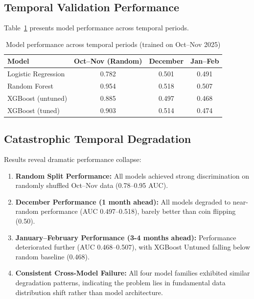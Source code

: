 \documentclass{report}
\begin{document}
\subsection{Temporal Validation Performance}

Table~\ref{tab:temporal_perf} presents model performance across temporal
periods.

\begin{table}[H]
\centering
\caption{Model performance across temporal periods (trained on Oct--Nov
  2025)}
\label{tab:temporal_perf}
\begin{tabular}{lccc}
\toprule
\textbf{Model} & \textbf{Oct--Nov (Random)} & \textbf{December} &
  \textbf{Jan--Feb} \\
\midrule
Logistic Regression & 0.782 & 0.501 & 0.491 \\
Random Forest       & 0.954 & 0.518 & 0.507 \\
XGBoost (untuned)   & 0.885 & 0.497 & 0.468 \\
XGBoost (tuned)     & 0.903 & 0.514 & 0.474 \\
\bottomrule
\end{tabular}
\end{table}

\subsection{Catastrophic Temporal Degradation}

Results reveal dramatic performance collapse:

\begin{enumerate}
\item \textbf{Random Split Performance:} All models achieved strong
  discrimination on randomly shuffled Oct--Nov data (0.78--0.95 AUC).
\item \textbf{December Performance (1 month ahead):} All models degraded to
  near-random performance (AUC 0.497--0.518), barely better than coin
  flipping (0.50).
\item \textbf{January--February Performance (3-4 months ahead):}
  Performance deteriorated further (AUC 0.468--0.507), with XGBoost Untuned
  falling below random baseline (0.468).
\item \textbf{Consistent Cross-Model Failure:} All four model families
  exhibited similar degradation patterns, indicating the problem lies in
  fundamental data distribution shift rather than model architecture.
\end{enumerate}
\end{document}
